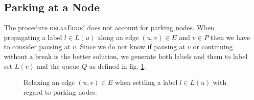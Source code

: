 \subsection{Parking at a Node}
The procedure \textsc{relaxEdge$'$} does not account for parking nodes. When propagating a label $l \in L(u)$ along an edge $(u,v) \in E$ and $v \in P$ then we have to consider pausing at $v$. Since we do not know if pausing at $v$ or continuing without a break is the better solution, we generate both labels and them to label set $L(v)$ and the queue $Q$ as defined in fig. \ref{alg:relax_edge}.

\begin{figure}[hbtp]
	\setlength{\interspacetitleruled}{0pt}%
	\setlength{\algotitleheightrule}{0pt}%
	\begin{algorithm*}[H]
		\DontPrintSemicolon



	\end{algorithm*}
	\setlength{\interspacetitleruled}{2pt}%
	\setlength{\algotitleheightrule}{\algotitleheightruledefault}%

	\caption{\label{alg:relax_edge}Relaxing an edge $(u,v) \in E$ when settling a label $l \in L(u)$ with regard to parking nodes.}
\end{figure}

